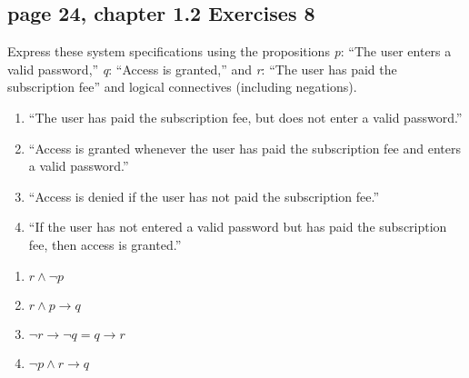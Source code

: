 \documentclass[sigconf]{acmart}
\begin{document}
\subsection{page 24, chapter 1.2 Exercises 8}
\begin{shaded}
    Express these system specifications using the propositions \textit{p}: “The user enters a valid password,” \textit{q}: “Access is granted,” and \textit{r}: “The user has paid the subscription fee” and logical connectives (including negations).
    \begin{enumerate}[label=(\alph*)]
        \item “The user has paid the subscription fee, but does not
        enter a valid password.”
        \item “Access is granted whenever the user has paid the
        subscription fee and enters a valid password.”
        \item “Access is denied if the user has not paid the subscription fee.”
        \item “If the user has not entered a valid password but has
        paid the subscription fee, then access is granted.”
    \end{enumerate}
\end{shaded}  
\begin{enumerate}[label=(\alph*)]
	\item $r \land \neg p$
	\item \underline{$r \land p \rightarrow q$}
	\item \underline{$ \neg r \rightarrow \neg q = q \rightarrow r$}
	\item \underline{$ \neg p \land r \rightarrow q$}
\end{enumerate}
\end{document}

